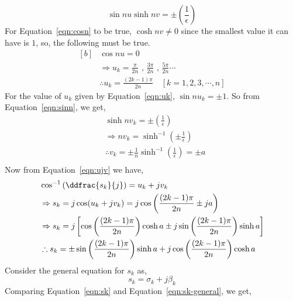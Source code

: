 \begin{equation}
    \sin nu \sinh nv=\pm\left(\frac{1}{\epsilon}\right)
    \label{eqn:sinn}
\end{equation}
For Equation~\ref{eqn:cosn} to be true, $\cosh nv\neq0$ since the smallest value it can have is $1$, so, the following must be true.
\begin{equation}
    \begin{aligned}[b]
        &\cos nu = 0\\
        &\Rightarrow u_k = \frac{\pi}{2n} \text{ , } \frac{3\pi}{2n} \text{ , } \frac{5\pi}{2n}\cdots \\
        &\therefore u_k = \frac{(2k-1)\pi}{2n} \quad
        [k=1,2,3,\cdots,n]
    \end{aligned}
    \label{eqn:uk}
\end{equation}
For the value of $u_k$ given by Equation~\ref{eqn:uk}, $\sin nu_k=\pm 1$. So from Equation~\ref{eqn:sinn}, we get,
\begin{equation*}
    \begin{aligned}
        &\sinh nv_k=\pm\left(\frac{1}{\epsilon}\right)\\
        &\Rightarrow nv_k=\sinh^{-1}\left(\pm\frac{1}{\epsilon}\right)\\
        &\therefore v_k=\pm\frac{1}{n}\sinh^{-1}\left(\frac{1}{\epsilon}\right)=\pm a\\
    \end{aligned}
\end{equation*}
Now from Equation~\ref{eqn:ujv} we have,
\begin{equation}
    \begin{aligned}[b]
        &\cos^{-1}\left(\ddfrac{s_k}{j}\right)=u_k+jv_k\\
        &\Rightarrow s_k=j\cos(u_k+jv_k)
        =j\cos\left(\frac{(2k-1)\pi}{2n}\pm j a\right)\\
        &\Rightarrow s_k=j\left[\cos\left(\frac{(2k-1)\pi}{2n}\right)\cosh a \pm j\sin\left(\frac{(2k-1)\pi}{2n}\right)\sinh a \right]\\
        &\therefore s_k=\pm \sin\left(\frac{(2k-1)\pi}{2n}\right)\sinh a + j\cos\left(\frac{(2k-1)\pi}{2n}\right)\cosh a 
    \end{aligned}
    \label{eqn:sk}
\end{equation}
Consider the general equation for $s_k$ as,
\begin{equation}
    s_k=\sigma_k+j\beta_k
    \label{eqn:sk-general}
\end{equation}
Comparing Equation~\ref{eqn:sk} and Equation~\ref{eqn:sk-general}, we get,
